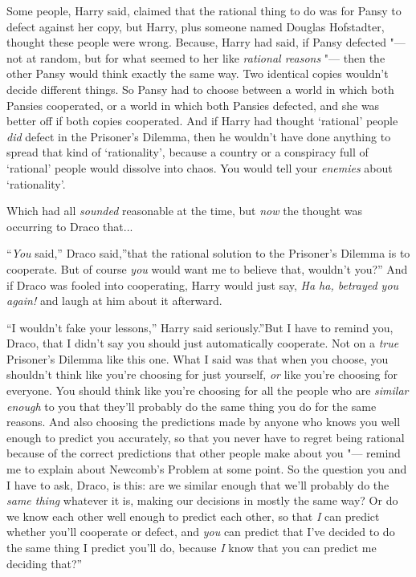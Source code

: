 Some people, Harry said, claimed that the rational thing to do was for
Pansy to defect against her copy, but Harry, plus someone named Douglas
Hofstadter, thought these people were wrong. Because, Harry had said, if
Pansy defected "--- not at random, but for what seemed to her like
\emph{rational reasons} "--- then the other Pansy would think exactly the
same way. Two identical copies wouldn't decide different things. So
Pansy had to choose between a world in which both Pansies cooperated, or
a world in which both Pansies defected, and she was better off if both
copies cooperated. And if Harry had thought `rational' people \emph{did}
defect in the Prisoner's Dilemma, then he wouldn't have done anything to
spread that kind of `rationality', because a country or a conspiracy
full of `rational' people would dissolve into chaos. You would tell your
\emph{enemies} about `rationality'.

Which had all \emph{sounded} reasonable at the time, but \emph{now} the
thought was occurring to Draco that...

``\emph{You} said,'' Draco said,''that the rational solution to the
Prisoner's Dilemma is to cooperate. But of course \emph{you} would want
me to believe that, wouldn't you?'' And if Draco was fooled into
cooperating, Harry would just say, \emph{Ha ha, betrayed you again!} and
laugh at him about it afterward.

``I wouldn't fake your lessons,'' Harry said seriously.''But I have to
remind you, Draco, that I didn't say you should just automatically
cooperate. Not on a \emph{true} Prisoner's Dilemma like this one. What I
said was that when you choose, you shouldn't think like you're choosing
for just yourself, \emph{or} like you're choosing for everyone. You
should think like you're choosing for all the people who are
\emph{similar enough} to you that they'll probably do the same thing you
do for the same reasons. And also choosing the predictions made by
anyone who knows you well enough to predict you accurately, so that you
never have to regret being rational because of the correct predictions
that other people make about you "--- remind me to explain about Newcomb's
Problem at some point. So the question you and I have to ask, Draco, is
this: are we similar enough that we'll probably do the \emph{same thing}
whatever it is, making our decisions in mostly the same way? Or do we
know each other well enough to predict each other, so that \emph{I} can
predict whether you'll cooperate or defect, and \emph{you} can predict
that I've decided to do the same thing I predict you'll do, because
\emph{I} know that you can predict me deciding that?''

